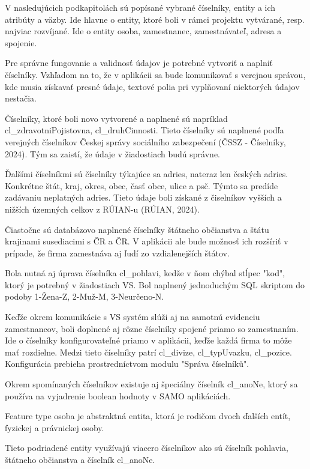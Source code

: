 V nasledujúcich podkapitolách sú popísané vybrané číselníky, entity a ich atribúty a väzby. Ide hlavne o entity, ktoré boli v rámci projektu vytvárané, resp. najviac rozvíjané. Ide o entity osoba, zamestnanec, zamestnávateľ, adresa a spojenie.


Pre správne fungovanie a validnosť údajov je potrebné vytvoriť a naplniť číselníky. Vzhľadom na to, že v aplikácii sa bude komunikovať s verejnou správou, kde musia získavať presné údaje, textové polia pri vyplňovaní niektorých údajov nestačia. 

Číselníky, ktoré boli novo vytvorené a naplnené sú napríklad cl\_zdravotniPojistovna, cl\_druhCinnosti. Tieto číselníky sú naplnené podľa verejných číselníkov Českej správy sociálního zabezpečení \scr(ČSSZ - Číselníky, 2024). Tým sa zaistí, že údaje v žiadostiach budú správne. 

Ďalšími číselníkmi sú číselníky týkajúce sa adries, nateraz len českých adries. Konkrétne štát, kraj, okres, obec, časť obce, ulice a psč. Týmto sa predíde zadávaniu neplatných adries. Tieto údaje boli získané z čiselníkov vyšších a nižších územných celkov z RÚIAN-u \scr(RÚIAN, 2024).

Čiastočne sú databázovo naplnené číselníky štátneho občianstva a štátu krajinami susediacimi s ČR a ČR. V aplikácii ale bude možnosť ich rozšíriť v prípade, že firma zamestnáva aj ľudí zo vzdialenejších štátov.

Bola nutná aj úprava číselníka cl\_pohlavi, kedže v ňom chýbal stĺpec "kod", ktorý je potrebný v žiadostiach VS. Bol naplnený jednoduchým SQL skriptom do podoby 1-Žena-Z, 2-Muž-M, 3-Neurčeno-N.

Keďže okrem komunikácie s VS systém slúži aj na samotnú evidenciu zamestnancov, boli doplnené aj rôzne číselníky spojené priamo so zamestnaním. Ide o číselníky konfigurovateľné priamo v aplikácii, keďže každá firma to môže mať rozdielne. Medzi tieto číselníky patrí cl\_divize, cl\_typUvazku, cl\_pozice. Konfigurácia prebieha prostredníctvom modulu "Správa číselníků".

Okrem spomínaných číselníkov existuje aj špeciálny číselník cl_anoNe, ktorý sa používa na vyjadrenie boolean hodnoty v SAMO aplikáciách. 

Feature type osoba je abstraktná entita, ktorá je rodičom dvoch ďalších entít, fyzickej a právnickej osoby. 

Tieto podriadené entity využívajú viacero číselníkov ako sú číselník pohlavia, štátneho občianstva a číselník cl_anoNe.

